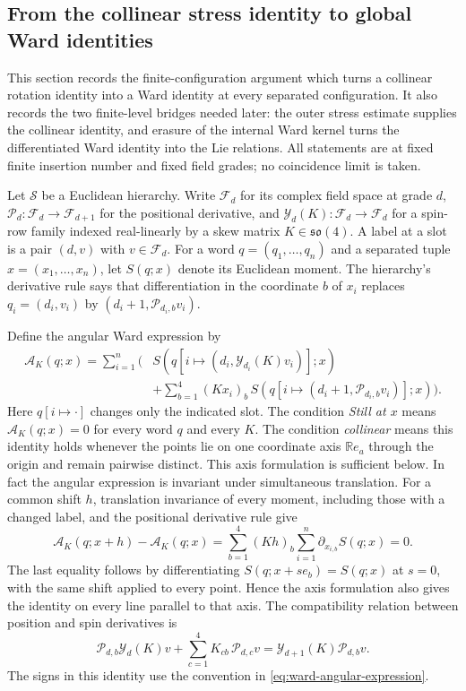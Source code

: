 \subsection{From the collinear stress identity to global Ward identities}
\label{sec:physical-ward-propagation}

This section records the finite-configuration argument which turns a collinear
rotation identity into a Ward identity at every separated configuration.  It
also records the two finite-level bridges needed later: the outer stress
estimate supplies the collinear identity, and erasure of the internal Ward
kernel turns the differentiated Ward identity into the Lie relations.  All
statements are at fixed finite insertion number and fixed field grades; no
coincidence limit is taken.

Let $\mathscr S$ be a Euclidean hierarchy.  Write $\mathcal F_d$ for its
complex field space at grade $d$, $\mathcal P_d:\mathcal F_d\to
\mathcal F_{d+1}$ for the positional derivative, and
$\mathcal Y_d(K):\mathcal F_d\to\mathcal F_d$ for a spin-row family indexed
real-linearly by a skew matrix $K\in\mathfrak{so}(4)$.  A label at a slot is
a pair $(d,v)$ with $v\in\mathcal F_d$.  For a word $q=(q_1,\ldots,q_n)$ and
a separated tuple $x=(x_1,\ldots,x_n)$, let $S(q;x)$ denote its Euclidean
moment.  The hierarchy's derivative rule says that differentiation in the
coordinate $b$ of $x_i$ replaces $q_i=(d_i,v_i)$ by
$(d_i+1,\mathcal P_{d_i,b}v_i)$.

Define the angular Ward expression by
\begin{align}
\mathcal A_K(q;x) = \sum_{i=1}^n \bigg(&S(q[i\mapsto
  (d_i,\mathcal Y_{d_i}(K)v_i)];x) \\
  &+\sum_{b=1}^4 (Kx_i)_b\,
  S(q[i\mapsto(d_i+1,\mathcal P_{d_i,b}v_i)];x)\bigg).
\label{eq:ward-angular-expression}
\end{align}
Here $q[i\mapsto\cdot]$ changes only the indicated slot.  The condition
\emph{Still at $x$} means $\mathcal A_K(q;x)=0$ for every word $q$ and every
$K$.  The condition \emph{collinear} means this identity holds whenever the
points lie on one coordinate axis $\mathbb Re_a$ through the origin and
remain pairwise distinct. This axis formulation is sufficient below.
In fact the angular expression is invariant under simultaneous translation.
For a common shift $h$, translation invariance of every moment, including
those with a changed label, and the positional derivative rule give
\[
 \mathcal A_K(q;x+h)-\mathcal A_K(q;x)
 =\sum_{b=1}^4(Kh)_b\sum_{i=1}^n
       \partial_{x_{i,b}}S(q;x)=0.
\]
The last equality follows by differentiating
$S(q;x+s e_b)=S(q;x)$ at $s=0$, with the same shift applied to every
point. Hence the axis formulation also gives the identity on every line
parallel to that axis.
The compatibility relation between position and spin derivatives is
\begin{equation}
 \mathcal P_{d,b}\mathcal Y_d(K)v
 +\sum_{c=1}^4 K_{cb}\,\mathcal P_{d,c}v
 =\mathcal Y_{d+1}(K)\mathcal P_{d,b}v.
\label{eq:ward-commutation}
\end{equation}
The signs in this identity use the convention in
\eqref{eq:ward-angular-expression}.

